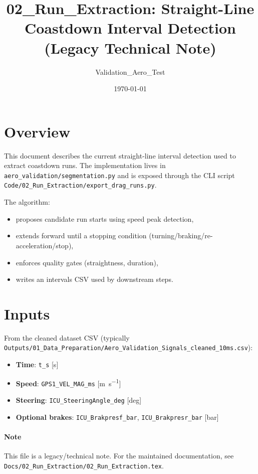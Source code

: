 \documentclass[11pt,a4paper]{article}
\title{02\_Run\_Extraction: Straight-Line Coastdown Interval Detection (Legacy Technical Note)}
\author{Validation\_Aero\_Test}
\date{\today}
\begin{document}
\maketitle

\section{Overview}
This document describes the current straight-line interval detection used to extract coastdown runs.
The implementation lives in \texttt{aero\_validation/segmentation.py} and is exposed through the CLI script
  \texttt{Code/02\_Run\_Extraction/export\_drag\_runs.py}.

The algorithm:
\begin{itemize}
  \item proposes candidate run starts using speed peak detection,
  \item extends forward until a stopping condition (turning/braking/re-acceleration/stop),
  \item enforces quality gates (straightness, duration),
  \item writes an intervals CSV used by downstream steps.
\end{itemize}

\section{Inputs}
From the cleaned dataset CSV (typically \texttt{Outputs/01\_Data\_Preparation/Aero\_Validation\_Signals\_cleaned\_10ms.csv}):
\begin{itemize}
  \item \textbf{Time}: \texttt{t\_s} [s]
  \item \textbf{Speed}: \texttt{GPS1\_VEL\_MAG\_ms} [\si{\meter\per\second}]
  \item \textbf{Steering}: \texttt{ICU\_SteeringAngle\_deg} [deg]
  \item \textbf{Optional brakes}: \texttt{ICU\_Brakpresf\_bar}, \texttt{ICU\_Brakpresr\_bar} [bar]
\end{itemize}

\paragraph{Note}
This file is a legacy/technical note. For the maintained documentation, see
  \texttt{Docs/02\_Run\_Extraction/02\_Run\_Extraction.tex}.
\end{document}
